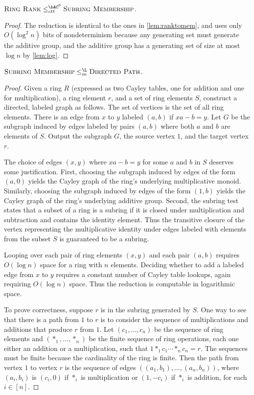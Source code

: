 \begin{lemma}\label{lem:ringranktomem}
  $\textsc{Ring Rank} \leq_{ctt}^{\bAC^0} \textsc{Subring Membership}$.
\end{lemma}
\begin{proof}
  The reduction is identical to the ones in \autoref{lem:ranktomem}, and uses only $O(\log^2 n)$ bits of nondeterminism because any generating set must generate the additive group, and the additive group has a generating set of size at most $\log n$ by \autoref{lem:log}.
\end{proof}

\begin{lemma}\label{lem:memtopath}
  $\textsc{Subring Membership} \leq_m^{\L} \textsc{Directed Path}$.
\end{lemma}
\begin{proof}
  Given a ring $R$ (expressed as two Cayley tables, one for addition and one for multiplication), a ring element $r$, and a set of ring elements $S$, construct a directed, labeled graph as follows.
  The set of vertices is the set of all ring elements.
  There is an edge from $x$ to $y$ labeled $(a, b)$ if $x a - b = y$.
  Let $G$ be the subgraph induced by edges labeled by pairs $(a, b)$ where both $a$ and $b$ are elements of $S$.
  Output the subgraph $G$, the source vertex $1$, and the target vertex $r$.

  The choice of edges $(x, y)$ where $x a - b = y$ for some $a$ and $b$ in $S$ deserves some justification.
  First, choosing the subgraph induced by edges of the form $(a, 0)$ yields the Cayley graph of the ring's underlying multiplicative monoid.
  Similarly, choosing the subgraph induced by edges of the form $(1, b)$ yields the Cayley graph of the ring's underlying additive group.
  Second, the subring test states that a subset of a ring is a subring if it is closed under multiplication and subtraction and contains the identity element.
  Thus the transitive closure of the vertex representing the multiplicative identity under edges labeled with elements from the subset $S$ is guaranteed to be a subring.

  Looping over each pair of ring elements $(x, y)$ and each pair $(a, b)$ requires $O(\log n)$ space for a ring with $n$ elements.
  Deciding whether to add a labeled edge from $x$ to $y$ requires a constant number of Cayley table lookups, again requiring $O(\log n)$ space.
  Thus the reduction is computable in logarithmic space.

  To prove correctness, suppose $r$ is in the subring generated by $S$.
  One way to see that there is a path from $1$ to $r$ is to consider the sequence of multiplications and additions that produce $r$ from $1$.
  Let $(c_1, \dotsc, c_n)$ be the sequence of ring elements and $(\ast_1, \dotsc, \ast_n)$ be the finite sequence of ring operations, each one either an addition or a multiplication, such that $1 \ast_1 c_1 \dotsb \ast_n c_n = r$.
  The sequences must be finite because the cardinality of the ring is finite.
  Then the path from vertex $1$ to vertex $r$ is the sequence of edges $((a_1, b_1), \dotsc, (a_n, b_n))$, where $(a_i, b_i)$ is $(c_i, 0)$ if $\ast_i$ is multiplication or $(1, -c_i)$ if $\ast_i$ is addition, for each $i \in [n]$.


\end{proof}
